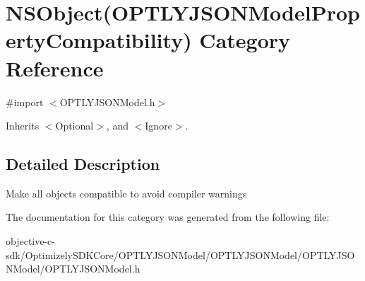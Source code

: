 \hypertarget{category_n_s_object_07_o_p_t_l_y_j_s_o_n_model_property_compatibility_08}{}\section{N\+S\+Object(O\+P\+T\+L\+Y\+J\+S\+O\+N\+Model\+Property\+Compatibility) Category Reference}
\label{category_n_s_object_07_o_p_t_l_y_j_s_o_n_model_property_compatibility_08}


{\ttfamily \#import $<$O\+P\+T\+L\+Y\+J\+S\+O\+N\+Model.\+h$>$}



Inherits $<$\+Optional$>$, and $<$\+Ignore$>$.



\subsection{Detailed Description}
Make all objects compatible to avoid compiler warnings 

The documentation for this category was generated from the following file\+:\begin{DoxyCompactItemize}
\item 
objective-\/c-\/sdk/\+Optimizely\+S\+D\+K\+Core/\+O\+P\+T\+L\+Y\+J\+S\+O\+N\+Model/\+O\+P\+T\+L\+Y\+J\+S\+O\+N\+Model/\+O\+P\+T\+L\+Y\+J\+S\+O\+N\+Model/O\+P\+T\+L\+Y\+J\+S\+O\+N\+Model.\+h\end{DoxyCompactItemize}
